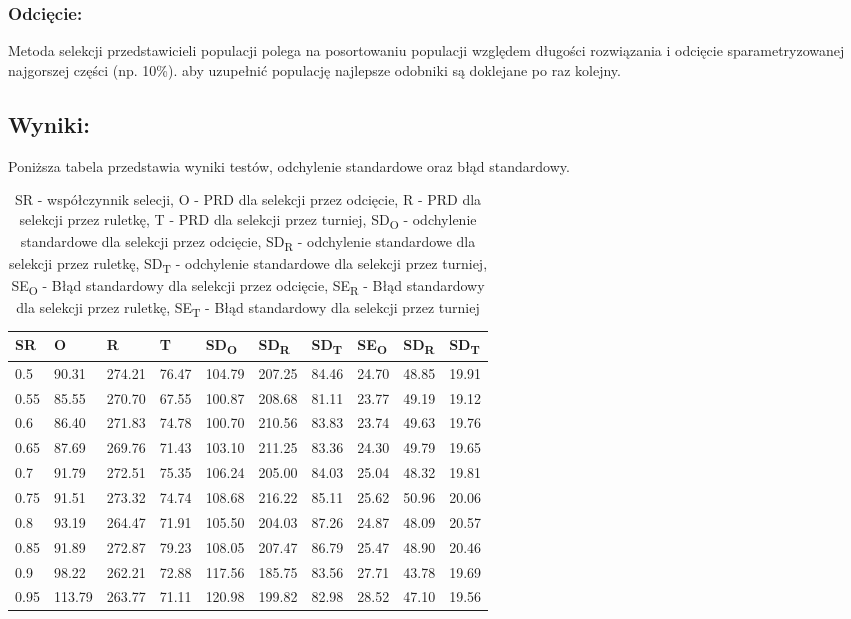     \subsubsection{Odcięcie:}
    Metoda selekcji przedstawicieli populacji polega na posortowaniu populacji względem długości rozwiązania i odcięcie sparametryzowanej najgorszej części (np. 10\%). aby uzupełnić populację najlepsze odobniki są doklejane po raz kolejny.
  \subsection{Wyniki: }
  Poniższa tabela przedstawia wyniki testów, odchylenie standardowe oraz błąd standardowy.
  \begin{table}[!ht]
    \centering
    \begin{tabular}{|l|l|l|l|l|l|l|l|l|l|}
    \hline
        SR & O & R & T & SD\textsubscript{O} & SD\textsubscript{R} & SD\textsubscript{T} & SE\textsubscript{O} & SD\textsubscript{R} & SD\textsubscript{T} \\ \hline
        0.5 & 90.31 & 274.21 & 76.47 & 104.79 & 207.25 & 84.46 & 24.70 & 48.85 & 19.91 \\ \hline
        0.55 & 85.55 & 270.70 & 67.55 & 100.87 & 208.68 & 81.11 & 23.77 & 49.19 & 19.12 \\ \hline
        0.6 & 86.40 & 271.83 & 74.78 & 100.70 & 210.56 & 83.83 & 23.74 & 49.63 & 19.76 \\ \hline
        0.65 & 87.69 & 269.76 & 71.43 & 103.10 & 211.25 & 83.36 & 24.30 & 49.79 & 19.65 \\ \hline
        0.7 & 91.79 & 272.51 & 75.35 & 106.24 & 205.00 & 84.03 & 25.04 & 48.32 & 19.81 \\ \hline
        0.75 & 91.51 & 273.32 & 74.74 & 108.68 & 216.22 & 85.11 & 25.62 & 50.96 & 20.06 \\ \hline
        0.8 & 93.19 & 264.47 & 71.91 & 105.50 & 204.03 & 87.26 & 24.87 & 48.09 & 20.57 \\ \hline
        0.85 & 91.89 & 272.87 & 79.23 & 108.05 & 207.47 & 86.79 & 25.47 & 48.90 & 20.46 \\ \hline
        0.9 & 98.22 & 262.21 & 72.88 & 117.56 & 185.75 & 83.56 & 27.71 & 43.78 & 19.69 \\ \hline
        0.95 & 113.79 & 263.77 & 71.11 & 120.98 & 199.82 & 82.98 & 28.52 & 47.10 & 19.56 \\ \hline
    \end{tabular}
    \caption{
      SR - współczynnik selecji,
      O - PRD dla selekcji przez odcięcie, 
      R - PRD dla selekcji przez ruletkę, 
      T - PRD dla selekcji przez turniej, 
      SD\textsubscript{O} - odchylenie standardowe dla selekcji przez odcięcie, 
      SD\textsubscript{R} - odchylenie standardowe dla selekcji przez ruletkę, 
      SD\textsubscript{T} - odchylenie standardowe dla selekcji przez turniej, 
      SE\textsubscript{O} - Błąd standardowy dla selekcji przez odcięcie,
      SE\textsubscript{R} - Błąd standardowy dla selekcji przez ruletkę, 
      SE\textsubscript{T} - Błąd standardowy dla selekcji przez turniej
    }

  \end{table}
